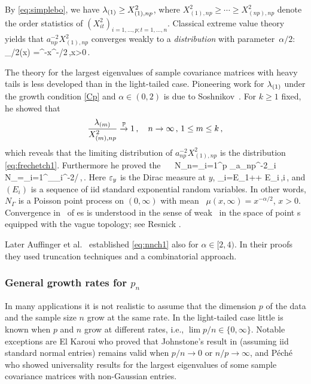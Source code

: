By \eqref{eq:simplebo}, we have $\lambda_{(1)}\ge X_{(1),np}^2$, where $X_{(1),np}^2\ge \cdots \ge X_{(np),np}^2$
denote the order statistics of $(X_{it}^2)_{i=1,\ldots,p;t=1,\ldots,n}$. Classical extreme value theory yields that $a_{np}^{-2} X_{(1),np}^2$ converges weakly to a  
{\em \Frechet distribution} with parameter~$\alpha/2$:
\beam\label{eq:frechetch1}
\Phi_{\alpha/2}(x) =\ex^{-x^{-\alpha/2}}\,,\qquad x>0\,.
\eeam
\par

The theory for the largest eigenvalues of sample covariance matrices with heavy tails is less developed than in the light-tailed case.
Pioneering work for $\lambda_{(1)}$ under the growth condition \eqref{Cp} and $\alpha\in (0,2)$
is due to Soshnikov~\cite{soshnikov:2004,soshnikov:2006}. For $k\ge 1$ fixed, he showed that
\begin{equation}\label{eq:sosh}
\frac{\lambda_{(m)}}{X_{(m),np}^2}\stackrel{\mathbb{P}}{\rightarrow} 1\,,\quad n \to \infty\,, \,1\le m\le k\,,
\end{equation}
which reveals that the limiting distribution of $a_{np}^{-2} X_{(1),np}^2$ is the \Frechet distribution \eqref{eq:frechetch1}. Furthermore he proved the \pp\ \con\
\beam\label{eq:nnch1}
N_n=\sum_{i=1}^p \vep_{a_{np}^{-2}\la_i} \std N_{\Gamma}=\sum_{i=1}^\infty \vep_{\Gamma_i^{-2/\alpha}}\,,\qquad \nto\,.
\eeam
Here $\varepsilon_y$ is the Dirac measure at $y$,
\beam\label{eq:Gammach1}
\Gamma_i=E_1+\cdots + E_i\,,\qquad i\,,
\eeam
and $(E_i)$ is a sequence of iid standard exponential random variables. In other words, $N_{\Gamma}$ is a Poisson point process on $(0,\infty)$ with mean \ms\
$\mu(x,\infty)= x^{-\alpha/2}$, \mbox{$x>0$}. Convergence in \ds\ of \pp es is understood in the sense of weak \con\
in the space of point \ms s equipped with the vague topology; see Resnick \cite{resnick:2007,resnick:1987}.

Later Auffinger et al.~\cite{auffinger:arous:peche:2009} established \eqref{eq:nnch1} also for $\alpha \in [2,4)$. In their proofs they used truncation techniques and a combinatorial approach.

\subsubsection*{General growth rates for $p_n$}

In many applications it is not realistic to assume
that the dimension $p$ of the data and the sample size $n$ grow at the same rate.
In the light-tailed case little is known when $p$ and $n$ grow at different rates, i.e., $\lim p/n \in\{ 0,\infty\}$. 
Notable exceptions are El Karoui \cite{elkaroui:2003} who proved that Johnstone's result in \cite{johnstone:2001} (assuming iid standard normal entries)
remains valid when $p/n\to 0$ or $n/p\to\infty$, and P{\'e}ch{\'e} \cite{peche:2009} who showed universality results for the largest eigenvalues of some sample covariance matrices with non-Gaussian entries.



